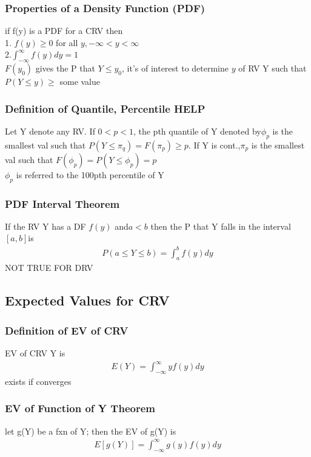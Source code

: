 \documentclass[12pt]{article}
\begin{document}
    \subsubsection{Properties of a Density Function (PDF)}
        if f(y) is a PDF for a CRV then\\
        1. $ f(y) \ge 0 $ for all $ y,-\infty < y < \infty  $\\
        2.$ \int_{-\infty }^{ \infty  } f(y)dy = 1$\\
        $ F(y_{0}) $ gives the P that $ Y \le y_{0} $, it's of interest
        to determine $ y $ of RV Y such that $ P(Y \le y) \ge $ some 
        value 
    \subsubsection{Definition of Quantile, Percentile HELP}
        Let Y denote any RV. If $ 0 < p < 1 $, the pth quantile of
        Y denoted by$ \phi _{p} $ is the smallest val such that
        $ P(Y \le \pi _{q}) = F(\pi _{p}) \ge p $. If Y is cont.,$ \pi _{p} $
        is the smallest val such that $ F(\phi_{p})= P(Y \le \phi _{p})= p $\\
        $ \phi _{p} $ is referred to the 100pth percentile of Y
    \subsubsection{PDF Interval Theorem}
        If the RV Y has a DF $ f(y) $ and$ a< b $ then the P that Y 
        falls in the interval $ [a,b] $is 
        \begin{align*}
            P(a \le Y \le b) = \int_{a}^{b} f(y)dy
        \end{align*}
        NOT TRUE FOR DRV
\subsection{Expected Values for CRV}
    \subsubsection{Definition of EV of CRV}
        EV of CRV Y is 
        \begin{align*}
            E(Y) =  \int_{-\infty }^{ \infty  }yf(y)dy
        \end{align*}
        exists if converges
    \subsubsection{EV of Function of Y Theorem}
        let g(Y) be a fxn of Y; then the EV of g(Y) is 
        \begin{align*}
            E[g(Y)] = \int_{-\infty }^{ \infty  }g(y)f(y)dy
        \end{align*}
\end{document}
